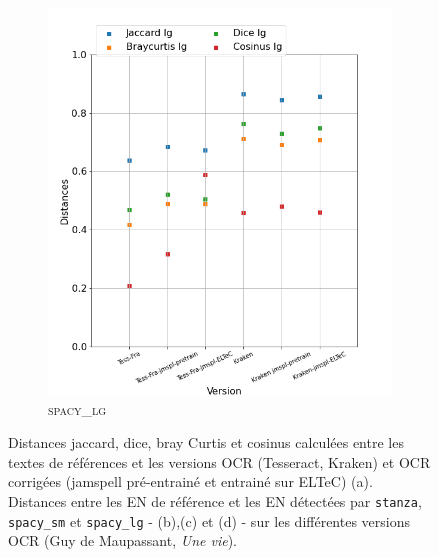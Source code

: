 \begin{figure}[H]
\begin{minipage}{6cm}
\begin{subfigure}{0.89\textwidth}
  \includegraphics[width=.89\textwidth]{IMAGES/ELTeC_DISTANCES_spaCy3.5.1/MAUPASSANT-graph-dist-spaCy3.5.1-lg.png}
   \caption{\textsc{spacy\_lg}}
  \label{fig: }
  \end{subfigure}
  \end{minipage}
\caption{Distances jaccard, dice, bray Curtis et cosinus calculées entre les textes de références et les versions OCR (Tesseract, Kraken) et OCR corrigées (jamspell pré-entrainé et entrainé sur ELTeC) (a). Distances entre les EN de référence et les EN détectées par \texttt{stanza}, \texttt{spacy\_sm} et \texttt{spacy\_lg} - (b),(c) et (d) - sur les différentes versions OCR (Guy de Maupassant, \textit{Une vie}).}
\label{fig:}
\end{figure}


